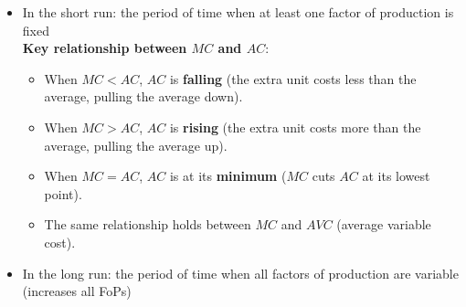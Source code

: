 \documentclass[a4paper,12pt]{article}
\begin{document}
\begin{itemize}
  \item In the short run: the period of time when at least one factor of production is fixed\\
  \textbf{Key relationship between $MC$ and $AC$}:
\begin{itemize}
  \item When $MC < AC$, $AC$ is \textbf{falling} (the extra unit costs less than the average, pulling the average down).
  \item When $MC > AC$, $AC$ is \textbf{rising} (the extra unit costs more than the average, pulling the average up).
  \item When $MC = AC$, $AC$ is at its \textbf{minimum} ($MC$ cuts $AC$ at its lowest point).
  \item The same relationship holds between $MC$ and $AVC$ (average variable cost).
\end{itemize}
 
\begin{center}
\end{center}
 \item In the long run: the period of time when all factors of production are variable (increases all FoPs)
\end{itemize}
\end{document}
